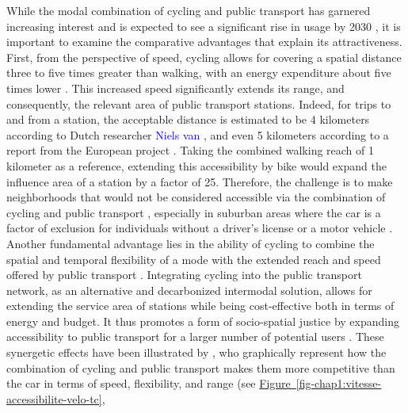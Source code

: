 \begin{refsegment}
While the modal combination of cycling and public transport has garnered increasing interest and is expected to see a significant rise in usage by 2030 \textcolor{blue}{\autocite[119]{goletz_intermodality_2020}}, it is important to examine the comparative advantages that explain its attractiveness. First, from the perspective of speed, cycling allows for covering a spatial distance three to five times greater than walking, with an energy expenditure about five times lower \textcolor{blue}{\autocite[50]{sebban_complementarite_2003}}. This increased speed significantly extends its range, and consequently, the relevant area of public transport stations. Indeed, for trips to and from a station, the acceptable distance is estimated to be 4 kilometers according to Dutch researcher \textcolor{blue}{Niels van} \textcolor{blue}{\textcite[4]{oort_overview_2020}}, and even 5 kilometers according to a report from the European project \textcolor{blue}{\textcite[4]{bitibi_bike_2017}}. Taking the combined walking reach of 1 kilometer as a reference, extending this accessibility by bike would expand the influence area of a station by a factor of 25. Therefore, the challenge is to make neighborhoods that would not be considered  accessible via the combination of cycling and public transport \textcolor{blue}{\autocite[17]{nlc_micromobility_2019}}, especially in suburban areas where the car is a factor of exclusion for individuals without a driver's license or a motor vehicle \textcolor{blue}{\autocite[85]{cervero_bike-and-ride_2013}}. Another fundamental advantage lies in the ability of cycling to combine the spatial and temporal flexibility of a  mode with the extended reach and speed offered by public transport \textcolor{blue}{\autocite[212]{kager_characterisation_2016}}. Integrating cycling into the public transport network, as an alternative and decarbonized intermodal solution, allows for extending the service area of stations while being cost-effective both in terms of energy and budget. It thus promotes a form of socio-spatial justice by expanding accessibility to public transport for a larger number of potential users \textcolor{blue}{\autocite[99-100]{levine_mobility_2019}}. These synergetic effects have been illustrated by \textcolor{blue}{\textcite[212]{kager_characterisation_2016}}, who graphically represent how the combination of cycling and public transport makes them more competitive than the car in terms of speed, flexibility, and range (see \hyperref[fig-chap1:vitesse-accessibilite-velo-tc]{Figure~\ref{fig-chap1:vitesse-accessibilite-velo-tc}}, 
\end{refsegment}
